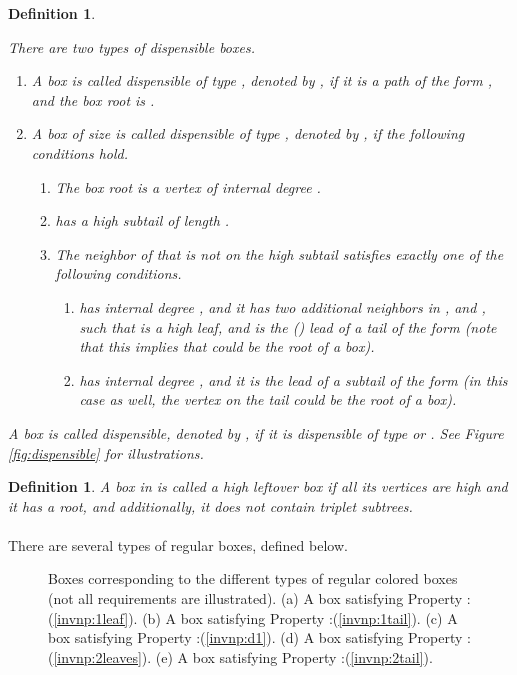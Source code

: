 \documentclass[11pt]{article}
\def\dnsitem{\vspace{-7pt}\item}
\def\dnssubitem{\vspace{-5pt}\item}
\newtheorem{definition}[theorem]{Definition}
\theoremstyle{definition}
\begin{document}
\begin{definition}
\label{def:dispensible}

There are two types of dispensible boxes.
\begin{enumerate}
	\dnsitem A box  is called \emph{dispensible of type }, denoted by , if it is a path  of the form , and the box root is .

	\dnsitem A box  of size  is called \emph{dispensible of type }, denoted by , if the following conditions hold.
	\begin{enumerate}
		\dnsitem The box root  is a  vertex of internal degree .
		\dnssubitem  has a high subtail of length .
		\dnssubitem The neighbor  of  that is not on the high subtail satisfies exactly one of the following conditions.
		\begin{enumerate}
			\dnsitem 
			\label{def:dispensible:d2:p1}
			 has internal degree , and it has two additional neighbors in ,  and , such that  is a high leaf, 
			and  is the () lead of a tail of the form  (note that this implies that  could be the root of a  box).
			\dnssubitem 
			\label{def:dispensible:d2:p2}
			 has internal degree , and it is the lead of a subtail of the form  (in this case as well, the  vertex on the tail could be the root of a  box).
		\end{enumerate}
	\end{enumerate}
\end{enumerate}
 
A box is called \emph{dispensible}, denoted by , if it is dispensible of type  or .
See Figure \ref{fig:dispensible} for illustrations.
\end{definition}

\begin{definition}
A box  in  is called a \emph{high leftover box} if all its vertices are high and it has a  root,
and additionally, it does not contain triplet subtrees. 
\end{definition}

\paragraph{}
There are several types of regular boxes, defined below.

\begin{figure}[thbp]
  \caption{\sf Boxes corresponding to the different types of regular colored boxes (not all requirements are illustrated).
		(a) A box satisfying Property :(\ref{invnp:1leaf}).
		(b) A box satisfying Property :(\ref{invnp:1tail}).
		(c) A box satisfying Property :(\ref{invnp:d1}).
		(d) A box satisfying Property :(\ref{invnp:2leaves}).
		(e) A box satisfying Property :(\ref{invnp:2tail}).}
  \medskip
  \centering
  \label{fig:regular_complex}
\end{figure}
\end{document}
